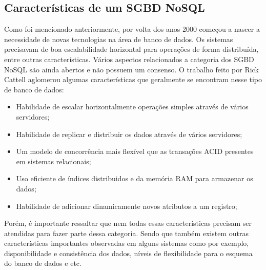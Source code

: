 \subsection{Características de um SGBD NoSQL}
	Como foi mencionado anteriormente, por volta dos anos 2000 começou a nascer a necessidade de novas tecnologias na área de banco de dados. Os sistemas precisavam de boa escalabilidade horizontal para operações de forma distribuída, entre outras características. Vários aspectos relacionados a categoria dos SGBD NoSQL são ainda abertos e não possuem um consenso. O trabalho feito por Rick Cattell\cite{Cattell:2011:SSN:1978915.1978919} aglomerou algumas características que geralmente se encontram nesse tipo de banco de dados: 
	\begin{itemize}
		\item Habilidade de escalar horizontalmente operações simples através de vários servidores;
		\item Habilidade de replicar e distribuir os dados através de vários servidores;
		\item Um modelo de concorrência mais flexível que as transações ACID presentes em sistemas relacionais;
		\item Uso eficiente de índices distribuidos e da memória RAM para armazenar os dados;
		\item Habilidade de adicionar dinamicamente novos atributos a um registro;
	\end{itemize}
	
	Porém, é importante ressaltar que nem todas essas características precisam ser atendidas para fazer parte dessa categoria. Sendo que também existem outras características importantes observadas em alguns sistemas como por exemplo, disponibilidade e consistência dos dados, níveis de flexibilidade para o esquema do banco de dados e etc.

